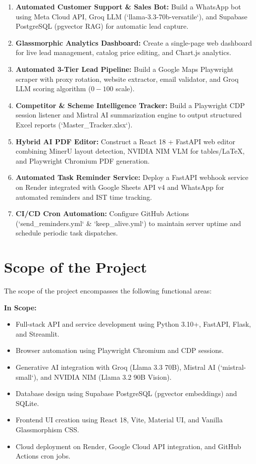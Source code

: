 \documentclass[12pt,a4paper]{report}
\begin{document}
\begin{enumerate}[leftmargin=*,itemsep=4pt]
    \item \textbf{Automated Customer Support & Sales Bot:} Build a WhatsApp bot using Meta Cloud API, Groq LLM (`llama-3.3-70b-versatile`), and Supabase PostgreSQL (pgvector RAG) for automatic lead capture.

    \item \textbf{Glassmorphic Analytics Dashboard:} Create a single-page web dashboard for live lead management, catalog price editing, and Chart.js analytics.

    \item \textbf{Automated 3-Tier Lead Pipeline:} Build a Google Maps Playwright scraper with proxy rotation, website extractor, email validator, and Groq LLM scoring algorithm ($0-100$ scale).

    \item \textbf{Competitor & Scheme Intelligence Tracker:} Build a Playwright CDP session listener and Mistral AI summarization engine to output structured Excel reports (`Master_Tracker.xlsx`).

    \item \textbf{Hybrid AI PDF Editor:} Construct a React 18 + FastAPI web editor combining MinerU layout detection, NVIDIA NIM VLM for tables/LaTeX, and Playwright Chromium PDF generation.

    \item \textbf{Automated Task Reminder Service:} Deploy a FastAPI webhook service on Render integrated with Google Sheets API v4 and WhatsApp for automated reminders and IST time tracking.

    \item \textbf{CI/CD Cron Automation:} Configure GitHub Actions (`send_reminders.yml` & `keep_alive.yml`) to maintain server uptime and schedule periodic task dispatches.
\end{enumerate}

\section{Scope of the Project}

The scope of the project encompasses the following functional areas:

\textbf{In Scope:}
\begin{itemize}[leftmargin=*,itemsep=2pt]
    \item Full-stack API and service development using Python 3.10+, FastAPI, Flask, and Streamlit.
    \item Browser automation using Playwright Chromium and CDP sessions.
    \item Generative AI integration with Groq (Llama 3.3 70B), Mistral AI (`mistral-small`), and NVIDIA NIM (Llama 3.2 90B Vision).
    \item Database design using Supabase PostgreSQL (pgvector embeddings) and SQLite.
    \item Frontend UI creation using React 18, Vite, Material UI, and Vanilla Glassmorphism CSS.
    \item Cloud deployment on Render, Google Cloud API integration, and GitHub Actions cron jobs.
\end{itemize}
\end{document}
